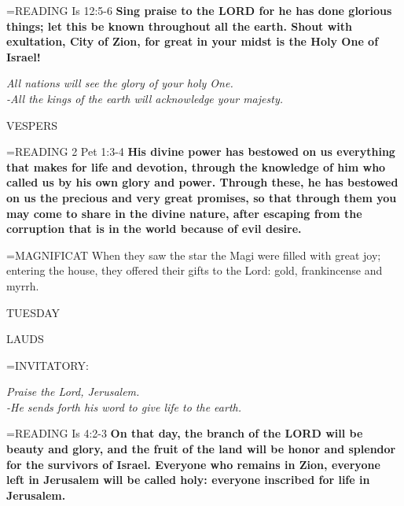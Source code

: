 \hangindent=\parindent \small{\uppercase{READING}}    Is 12:5-6 \textbf{   Sing praise to the LORD for he has done glorious things; let this be known throughout all the earth. Shout with exultation, City of Zion, for great in your midst is the Holy One of Israel!\\}

\begin{center}
\textit{All nations will see the glory of your holy One.\\
-All the kings of the earth will acknowledge your majesty.}
\end{center}

\begin{flushleft}\normalsize VESPERS\\\end{flushleft}

\hangindent=\parindent \small{\uppercase{READING}}   2 Pet 1:3-4 \textbf{  His divine power has bestowed on us everything that makes for life and devotion, through the knowledge of him who called us by his own glory and power. Through these, he has bestowed on us the precious and very great promises, so that through them you may come to share in the divine nature, after escaping from the corruption that is in the world because of evil desire.\\}

\hangindent=\parindent \small{MAGNIFICAT 	When they saw the star the Magi were filled with great joy; entering the house, they offered their gifts to the Lord: gold, frankincense and myrrh.\\}

\begin{center}
\normalsize TUESDAY
\end{center}

\begin{flushleft}\normalsize LAUDS\\\end{flushleft}

\hangindent=\parindent \small{INVITATORY:}
\begin{center}
\textit{Praise the Lord, Jerusalem.\\}
\textit{-He sends forth his word to give life to the earth.\\}
\end{center}

\hangindent=\parindent \small{\uppercase{READING}}   Is 4:2-3 \textbf{  On that day, the branch of the LORD will be beauty and glory, and the fruit of the land will be honor and splendor for the survivors of Israel. Everyone who remains in Zion, everyone left in Jerusalem will be called holy: everyone inscribed for life in Jerusalem.\\}

